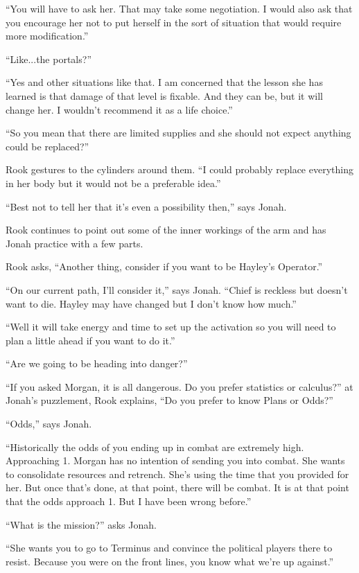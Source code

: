 ``You will have to ask her.  That may take some negotiation.  I would also ask that you encourage her not to put herself in the sort of situation that would require more modification.''

``Like...the portals?''

``Yes and other situations like that.  I am concerned that the lesson she has learned is that damage of that level is fixable.  And they can be, but it will change her.  I wouldn't recommend it as a life choice.''

``So you mean that there are limited supplies and she should not expect anything could be replaced?''

Rook gestures to the cylinders around them.  ``I could probably replace everything in her body but it would not be a preferable idea.''

``Best not to tell her that it's even a possibility then,'' says Jonah.

Rook continues to point out some of the inner workings of the arm and has Jonah practice with a few parts.

Rook asks, ``Another thing, consider if you want to be Hayley's Operator.''

``On our current path, I'll consider it,'' says Jonah.  ``Chief is reckless but doesn't want to die.  Hayley may have changed but I don't know how much.''

``Well it will take energy and time to set up the activation so you will need to plan a little ahead if you want to do it.''

``Are we going to be heading into danger?''

``If you asked Morgan, it is all dangerous.  Do you prefer statistics or calculus?''  at Jonah's puzzlement, Rook explains, ``Do you prefer to know Plans or Odds?''

``Odds,'' says Jonah.

``Historically the odds of you ending up in combat are extremely high. Approaching 1.  Morgan has no intention of sending you into combat.  She wants to consolidate resources and retrench.  She's using the time that you provided for her.  But once that's done, at that point, there will be combat.  It is at that point that the odds approach 1.  But I have been wrong before.''

``What is the mission?'' asks Jonah.

``She wants you to go to Terminus and convince the political players there to resist. Because you were on the front lines, you know what we're up against.''


